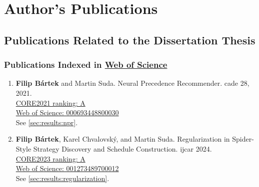 \chapter{Author's Publications}



\newcommand{\auth}\textbf
\newcommand{\core}[3]{\href{https://portal.core.edu.au/conf-ranks/#3/}{CORE#1 ranking: #2}}
\newcommand{\wos}[1]{\href{https://www.webofscience.com/wos/woscc/full-record/WOS:#1}{Web of Science: #1}}


\section{Publications Related to the Dissertation Thesis}

\subsection{Publications Indexed in \href{https://www.webofscience.com/}{Web of Science}}
\label{sec:wos}

\begin{enumerate}

\item \auth{Filip Bártek} and Martin Suda.
Neural Precedence Recommender.
\Gls{cade} 28, 2021.
\cite{DBLP:conf/cade/Bartek021}
\\
\core{2021}{A}{918}
\\
\wos{000693448800030}
\\
See \cref{sec:results:npr}.

\item \auth{Filip Bártek}, Karel Chvalovský, and Martin Suda. Regularization in Spider-Style Strategy Discovery and Schedule Construction. \Gls{ijcar} 2024. \cite{DBLP:conf/ijcar/BartekCS24}
\\
\core{2023}{A}{1314}
\\
\wos{001273489700012}
\\
See \cref{sec:results:regularization}.

\end{enumerate}


